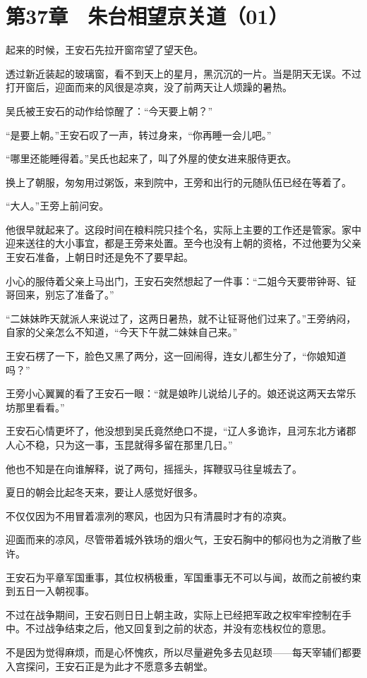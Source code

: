 \section{第37章　朱台相望京关道（01）}

起来的时候，王安石先拉开窗帘望了望天色。

透过新近装起的玻璃窗，看不到天上的星月，黑沉沉的一片。当是阴天无误。不过打开窗后，迎面而来的风很是凉爽，没了前两天让人烦躁的暑热。

吴氏被王安石的动作给惊醒了：“今天要上朝？”

“是要上朝。”王安石叹了一声，转过身来，“你再睡一会儿吧。”

“哪里还能睡得着。”吴氏也起来了，叫了外屋的使女进来服侍更衣。

换上了朝服，匆匆用过粥饭，来到院中，王旁和出行的元随队伍已经在等着了。

“大人。”王旁上前问安。

他很早就起来了。这段时间在粮料院只挂个名，实际上主要的工作还是管家。家中迎来送往的大小事宜，都是王旁来处置。至今也没有上朝的资格，不过他要为父亲王安石准备，上朝日时还是免不了要早起。

小心的服侍着父亲上马出门，王安石突然想起了一件事：“二姐今天要带钟哥、钲哥回来，别忘了准备了。”

“二妹妹昨天就派人来说过了，这两日暑热，就不让钲哥他们过来了。”王旁纳闷，自家的父亲怎么不知道，“今天下午就二妹妹自己来。”

王安石楞了一下，脸色又黑了两分，这一回闹得，连女儿都生分了，“你娘知道吗？”

王旁小心翼翼的看了王安石一眼：“就是娘昨儿说给儿子的。娘还说这两天去常乐坊那里看看。”

王安石心情更坏了，他没想到吴氏竟然绝口不提，“辽人多诡诈，且河东北方诸郡人心不稳，只为这一事，玉昆就得多留在那里几日。”

他也不知是在向谁解释，说了两句，摇摇头，挥鞭驭马往皇城去了。

夏日的朝会比起冬天来，要让人感觉好很多。

不仅仅因为不用冒着凛冽的寒风，也因为只有清晨时才有的凉爽。

迎面而来的凉风，尽管带着城外铁场的烟火气，王安石胸中的郁闷也为之消散了些许。

王安石为平章军国重事，其位权柄极重，军国重事无不可以与闻，故而之前被约束到五日一入朝视事。

不过在战争期间，王安石则日日上朝主政，实际上已经把军政之权牢牢控制在手中。不过战争结束之后，他又回复到之前的状态，并没有恋栈权位的意思。

不是因为觉得麻烦，而是心怀愧疚，所以尽量避免多去见赵顼——每天宰辅们都要入宫探问，王安石正是为此才不愿意多去朝堂。

